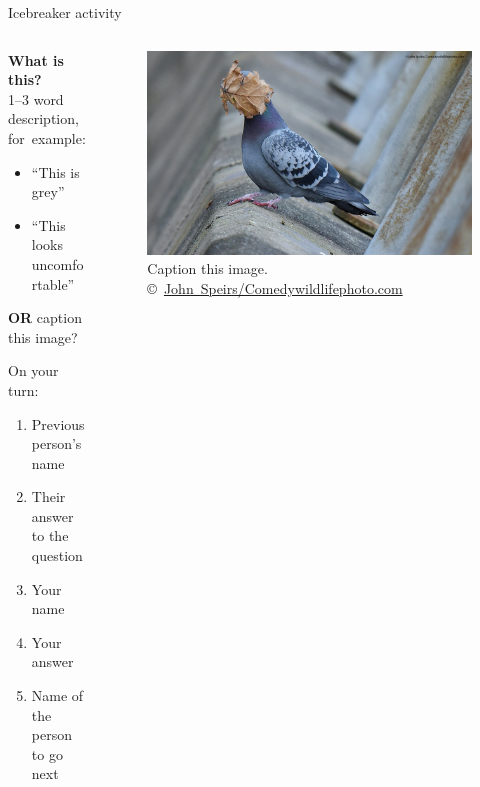 \documentclass[
  ignorenonframetext,
]{beamer}
\providecommand{\tightlist}{%
  \setlength{\itemsep}{0pt}\setlength{\parskip}{0pt}}
\begin{document}
\begin{frame}{ Icebreaker activity}
\protect\hypertarget{icebreaker-activity}{}
\begin{columns}[T,onlytextwidth]
\begin{column}{0.48\textwidth}
\textbf{What is this?}\\
1--3 word description, for~example:

\begin{itemize}
\tightlist
\item
  ``This is grey''
\item
  ``This looks uncomfortable''
\end{itemize}

\textbf{OR} caption this image?

\hfill\break
On your turn:

\begin{enumerate}
\item
  Previous person's name
\item
  Their answer to the question
\item
  Your name
\item
  Your answer
\item
  Name of the person to go next
\end{enumerate}
\end{column}

\begin{column}{0.5\textwidth}
\begin{figure}
\centering
\includegraphics[width=1\textwidth,height=\textheight]{images/john-speirs_i-guess-summers-over.jpg}
\caption{Caption this image.\\
©~\href{https://www.comedywildlifephoto.com/gallery/comedy-wildlife-2021-competition-winners.php}{John~Speirs/\linebreak[0]Comedywildlifephoto.com}}
\end{figure}
\end{column}
\end{columns}
\end{frame}
\end{document}
